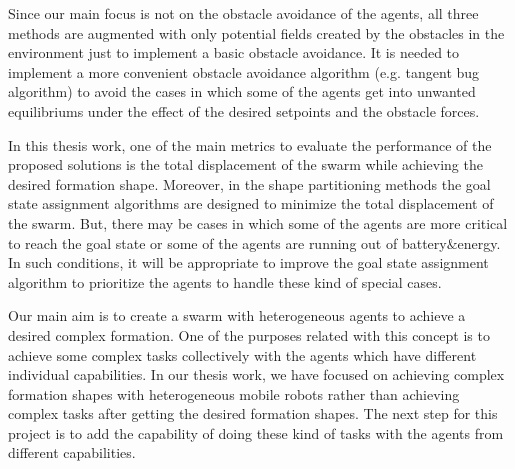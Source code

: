Since our main focus is not on the obstacle avoidance of the agents, all three methods are augmented with only potential fields created by the obstacles in the environment just to implement a basic obstacle avoidance. It is needed to implement a more convenient obstacle avoidance algorithm (e.g. tangent bug algorithm) to avoid the cases in which some of the agents get into unwanted equilibriums under the effect of the desired setpoints and the obstacle forces.
    
In this thesis work, one of the main metrics to evaluate the performance of the proposed solutions is the total displacement of the swarm while achieving the desired formation shape. Moreover, in the shape partitioning methods the goal state assignment algorithms are designed to minimize the total displacement of the swarm. But, there may be cases in which some of the agents are more critical to reach the goal state or some of the agents are running out of battery$\&$energy. In such conditions, it will be appropriate to improve the goal state assignment algorithm to prioritize the agents to handle these kind of special cases. 
    
Our main aim is to create a swarm with heterogeneous agents to achieve a desired complex formation. One of the purposes related with this concept is to achieve some complex tasks collectively with the agents which have different individual capabilities. In our thesis work, we have focused on achieving complex formation shapes with heterogeneous mobile robots rather than achieving complex tasks after getting the desired formation shapes. The next step for this project is to add the capability of doing these kind of tasks with the agents from different capabilities.
		
		
		
		
		
		
		
		
		
		
		
		
		
		
		
		
		